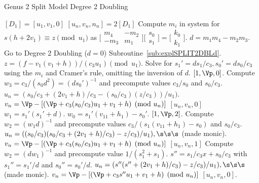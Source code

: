 \begin{algorithm}[htbp]
\caption{Genus 2 Split Model Degree 2 Doubling\label{alg:explSPLIT2DBL}}
\begin{algorithmic} [1]
\Require $[D_1]= [u_1, v_1,0]$ \smallskip
\Ensure $[u_n,v_n,n_n] = 2[D_1]$
\algrule
\State Compute $m_i$ in system for $s(h + 2v_1)\equiv z \pmod{u_1}$ as $ \bigl[
\begin{smallmatrix} m_4 & -m_2\\ -m_3 & m_1\end{smallmatrix}\bigr] \bigl[
\begin{smallmatrix} s_0\\ s_1 \end{smallmatrix} \bigr ] = \bigl[ \begin{smallmatrix}k_0
\\  k_1\end{smallmatrix} \bigr ]$.
\State $d = m_1m_4 - m_2m_3$.
 Go to Degree 2 Doubling ($d = 0$) Subroutine~\ref{sub:explSPLIT2DBLd}.
\EndIf
\State $z = (f - v_1(v_1 + h))/(c_3u_1) \pmod{u_1}.$
\State Solve for $s_1' = ds_1/c_3, s_0' = ds_0/c_3$ using the $m_i$ and Cramer's rule, omitting the inversion of $d$.
     \Return $[1,\Vp,0]$.
    \Else \hspace{4pt}
        \State Compute $w_3 = c_3/(s_0d^2) = (ds_0')^{-1}$ and precompute values $c_3/s_0$ and  $s_0/c_3$.
        \State $u_n = (s_0/c_3 + (2v_1+ h)/c_3 - (s_0/c_3)(z/c_3))/u_1)$.
        \State $v_n = \Vp - [(\Vp + c_3(s_0/c_3)u_1 + v_1 + h) \pmod{u_n}]$
        \State \Return $[u_n,v_n,0]$
    \EndIf
\EndIf
\State $w_1 = s_1'(s_1' + d)$.
    \State $w_0 = s_1'(v_{11} + h_1) - s_0'$.
     \Return $[1,\Vp,2]$.
    \Else \hspace{4pt}
        \State Compute $w_2 = (w_1d)^{-1}$ and precompute values $c_3/(s_1(v_{11} + h_1) - s_0)$ and $s_0/c_3$.
        \State $u_n = ((s_0/c_3)(s_0/c_3 + (2v_1+ h)/c_3) - z/c_3)/u_1), \s\s\s $ (made monic).
        \State $v_n = \Vp - [(\Vp + c_3(s_0/c_3)u_1 + v_1 + h) \pmod{u_n}]$
        \State \Return $[u_n,v_n,1]$
    \EndIf
\EndIf
\State Compute $w_2 = (dw_1)^{-1}$ and precompute value $1/(s_1^2 + s_1)$.
\State $s'' = s_1/c_3x + s_0/c_3$ with $s_1'' = s_1'/d$ and $s_0'' = s_0'/d$.
\State $u_n = (s''(s'' + (2v_1+ h)/c_3) - z/c_3)/u_1), \s\s\s $ (made monic).
\State $v_n = \Vp - [(\Vp + c_3s''u_1 + v_1 + h) \pmod{u_n}]$
\State \Return $[u_n,v_n,0]$.
\end{algorithmic}
\end{algorithm}
    

